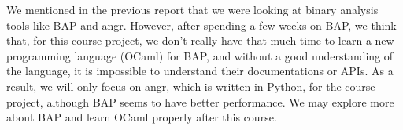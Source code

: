 We mentioned in the previous report that we were looking at binary analysis
tools like BAP and angr. However, after spending a few weeks on BAP, we think
that, for this course project, we don't really have that much time to learn a
new programming language (OCaml) for BAP, and without a good understanding of
the language, it is impossible to understand their documentations or APIs. As a
result, we will only focus on angr, which is written in Python, for the course
project, although BAP seems to have better performance. We may explore more
about BAP and learn OCaml properly after this course.

